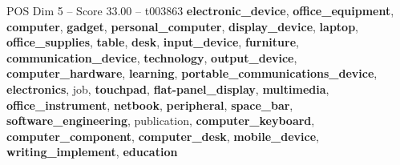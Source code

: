 \begin{textsample}{POS Dim 5 – Score 33.00 – t003863}  \label{ex:f5_pos_012}
\textbf{electronic\_device}, \textbf{office\_equipment}, \textbf{computer}, \textbf{gadget}, \textbf{personal\_computer}, \textbf{display\_device}, \textbf{laptop}, \textbf{office\_supplies}, \textbf{table}, \textbf{desk}, \textbf{input\_device}, \textbf{furniture}, \textbf{communication\_device}, \textbf{technology}, \textbf{output\_device}, \textbf{computer\_hardware}, \textbf{learning}, \textbf{portable\_communications\_device}, \textbf{electronics}, job, \textbf{touchpad}, \textbf{flat-panel\_display}, \textbf{multimedia}, \textbf{office\_instrument}, \textbf{netbook}, \textbf{peripheral}, \textbf{space\_bar}, \textbf{software\_engineering}, publication, \textbf{computer\_keyboard}, \textbf{computer\_component}, \textbf{computer\_desk}, \textbf{mobile\_device}, \textbf{writing\_implement}, \textbf{education}

\end{textsample}

